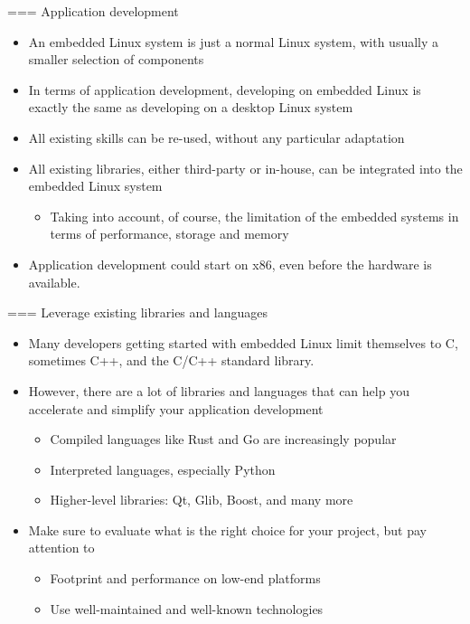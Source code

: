 === {Application development}
  \begin{itemize}
  \item An embedded Linux system is just a normal Linux system, with
    usually a smaller selection of components
  \item In terms of application development, developing on embedded
    Linux is exactly the same as developing on a desktop Linux system
  \item All existing skills can be re-used, without any particular
    adaptation
  \item All existing libraries, either third-party or in-house, can be
    integrated into the embedded Linux system
    \begin{itemize}
    \item Taking into account, of course, the limitation of the
      embedded systems in terms of performance, storage and memory
    \end{itemize}
  \item Application development could start on x86, even before
      the hardware is available.
  \end{itemize}


=== {Leverage existing libraries and languages}
  \begin{itemize}
  \item Many developers getting started with embedded Linux limit
    themselves to C, sometimes C++, and the C/C++ standard library.
  \item However, there are a lot of libraries and languages that can
    help you accelerate and simplify your application development
    \begin{itemize}
    \item Compiled languages like Rust and Go are increasingly popular
    \item Interpreted languages, especially Python
    \item Higher-level libraries: Qt, Glib, Boost, and many more
    \end{itemize}
  \item Make sure to evaluate what is the right choice for your
    project, but pay attention to
    \begin{itemize}
    \item Footprint and performance on low-end platforms
    \item Use well-maintained and well-known technologies
    \end{itemize}
  \end{itemize}


